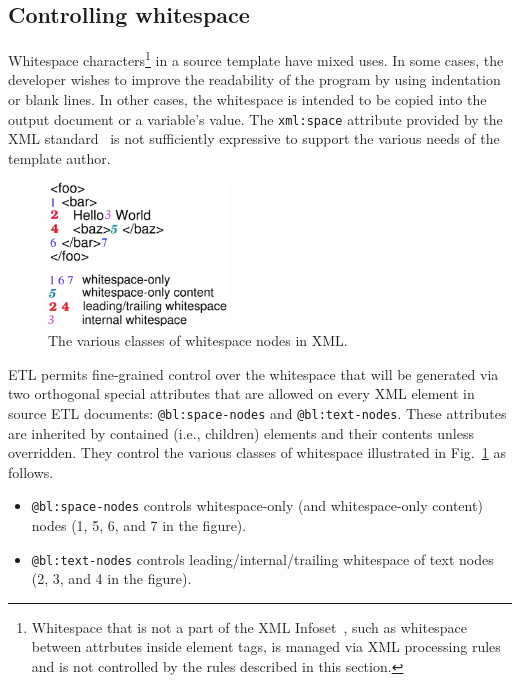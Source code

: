 \documentclass{www2003-submission}
\newcommand{\smtexttt}[1]{{\small\texttt{#1}}}
\newcommand{\figref}[1]{Fig.~\ref{fig-#1}}
\begin{document}
\subsection{Controlling whitespace}

Whitespace characters\footnote{Whitespace that is not a part of the
XML Infoset~\cite{XML-infoset}, such as whitespace between attrbutes inside element
tags, is managed via XML processing rules and is not controlled by the
rules described in this section.} in a source template have mixed uses.  In some
cases, the developer wishes to improve the readability of the program
by using indentation or blank lines.  In other cases, the whitespace
is intended to be copied into the output document or a variable's
value.  The \smtexttt{xml:space} attribute provided by the XML
standard~\cite[2.10]{XML} is not sufficiently expressive to support
the various needs of the template author.

\begin{figure}[bt]
\begin{centering}
\includegraphics[height=1.5in]{etl-whitespace-rules.eps}
\caption{The various classes of whitespace nodes in XML. \label{fig-ws-rules}}
\end{centering}
\end{figure}

ETL permits fine-grained control over the whitespace that will be
generated via two orthogonal special attributes that are allowed on
every XML element in source ETL documents: \smtexttt{@bl:space-nodes}
and \smtexttt{@bl:text-nodes}.  These attributes are inherited by
contained (i.e., children) elements and their contents unless
overridden.  They control the various classes of whitespace
illustrated in \figref{ws-rules} as follows.

\begin{itemize}
\item \smtexttt{@bl:space-nodes} controls whitespace-only (and
      whitespace-only content) nodes (1, 5, 6, and 7 in the figure).
\item \smtexttt{@bl:text-nodes} controls leading/internal/trailing whitespace of
      text nodes (2, 3, and 4 in the figure).
\end{itemize}
\end{document}
